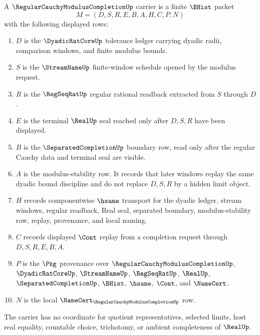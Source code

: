 \begin{definition}
\label{def:regular-cauchy-modulus-completion-carrier}
A $\RegularCauchyModulusCompletionUp$ carrier is a finite $\BHist$ packet
$$
M=(D,S,R,E,B,A,H,C,P,N)
$$
with the following displayed rows:
\begin{enumerate}
\item $D$ is the $\DyadicRatCoreUp$ tolerance ledger carrying dyadic radii, comparison windows, and finite modulus bounds.
\item $S$ is the $\StreamNameUp$ finite-window schedule opened by the modulus request.
\item $R$ is the $\RegSeqRatUp$ regular rational readback extracted from $S$ through $D$.
\item $E$ is the terminal $\RealUp$ seal reached only after $D,S,R$ have been displayed.
\item $B$ is the $\SeparatedCompletionUp$ boundary row, read only after the regular Cauchy data and terminal seal are visible.
\item $A$ is the modulus-stability row. It records that later windows replay the same dyadic bound discipline and do not replace $D,S,R$ by a hidden limit object.
\item $H$ records componentwise $\hsame$ transport for the dyadic ledger, stream windows, regular readback, Real seal, separated boundary, modulus-stability row, replay, provenance, and local naming.
\item $C$ records displayed $\Cont$ replay from a completion request through $D,S,R,E,B,A$.
\item $P$ is the $\Pkg$ provenance over $\RegularCauchyModulusCompletionUp$, $\DyadicRatCoreUp$, $\StreamNameUp$, $\RegSeqRatUp$, $\RealUp$, $\SeparatedCompletionUp$, $\BHist$, $\hsame$, $\Cont$, and $\NameCert$.
\item $N$ is the local $\NameCert_{\RegularCauchyModulusCompletionUp}$ row.
\end{enumerate}
The carrier has no coordinate for quotient representatives, selected limits, host real equality, countable choice, trichotomy, or ambient completeness of $\RealUp$.
\end{definition}

